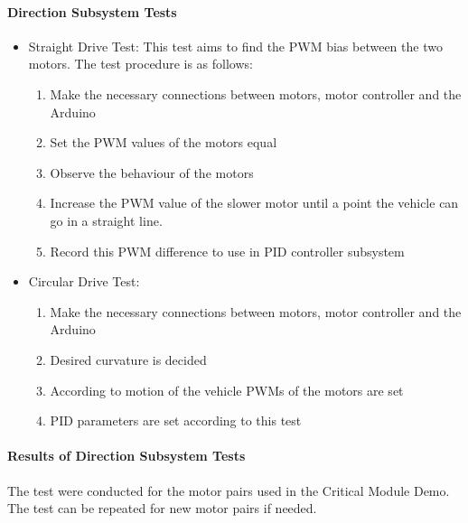\documentclass[a4paper,12pt]{article}
\begin{document}
	\paragraph{Direction Subsystem Tests}
	\begin{itemize}
	
		\item Straight Drive Test:
			This test aims to find the PWM bias between the two motors. The test procedure is as follows:
			\begin{enumerate}
				\item Make the necessary connections between motors, motor controller and the Arduino \vspace{-0.2cm}
				\item Set the PWM values of the motors equal \vspace{-0.2cm}
				\item Observe the behaviour of the motors \vspace{-0.2cm}
				\item Increase the PWM value of the slower motor until a point the vehicle can go in a straight line.
				\item Record this PWM difference to use in PID controller subsystem
			\end{enumerate}
				
		
		\item Circular Drive Test:
			\begin{enumerate}
				\item Make the necessary connections between motors, motor controller and the Arduino \vspace{-0.2cm}
				\item Desired curvature is decided \vspace{-0.2cm}
				\item  According to motion of the vehicle PWMs of the motors are set \vspace{-0.2cm}
				\item  PID parameters are set according to this test
			\end{enumerate}
		
		
	\end{itemize}
	
	\paragraph{Results of Direction Subsystem Tests}
		
		The test were conducted for the motor pairs used in the Critical Module Demo. The test can be repeated for new motor pairs if needed.
	
\end{document}
